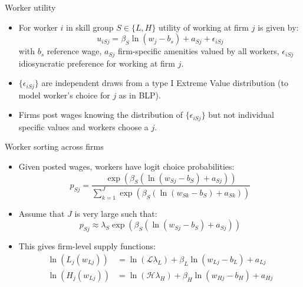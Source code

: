\documentclass[notes=show]{beamer}
\begin{document}
\begin{frame}{Worker utility}
\begin{itemize}
\item For worker $i$ in skill group $S \in \{ L,H \}$ utility of working at firm $j$ is given by:
\begin{equation*}
    u_{iSj} = \beta_{S} \ln(w_{j} - b_{s}) + a_{Sj} + \epsilon_{iSj}
\end{equation*}
with $b_{s}$ reference wage, $ a_{Sj}$ firm-specific amenities valued by all workers, $\epsilon_{iSj} $ idiosyncratic preference for working at firm $j$. \medskip
\item $ \{\epsilon_{iSj} \} $ are independent draws from a type I Extreme Value distribution (to model worker's choice for $j$ as in BLP). \medskip
\item Firms post wages knowing the distribution of $ \{\epsilon_{iSj} \} $ but not individual specific values and workers choose a $j$. 
\end{itemize}
\end{frame}

\begin{frame}{Worker sorting across firms}
\begin{itemize}
\item Given posted wages, workers have logit choice probabilities:
\begin{equation*}
    p_{Sj} = \frac{\exp(\beta_{S}(\ln(w_{Sj} - b_{S}) + a_{Sj}))}{\sum_{k=1}^{J} \exp(\beta_{S}(\ln(w_{Sk} - b_{S}) + a_{Sk}))}
\end{equation*}
\item Assume that $J$ is very large such that:
\begin{equation*}
    p_{Sj} \approx \lambda_{S} \exp(\beta_{S}(\ln(w_{Sj} - b_{S}) + a_{Sj}))
\end{equation*}
\item This gives firm-level supply functions:
\begin{align*}
    \ln(L_{j}(w_{Lj})) & = \ln(\mathcal{L} \lambda_{L}) + \beta_{L} \ln(w_{Lj} - b_{L}) + a_{Lj} \tag{5} \\
    \ln(H_{j}(w_{Lj})) & = \ln(\mathcal{H} \lambda_{H}) + \beta_{H} \ln(w_{Hj} - b_{H}) + a_{Hj} \tag{6} \\
\end{align*}
\end{itemize}
\end{frame}
\end{document}
